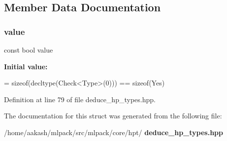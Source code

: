 \subsection{Member Data Documentation}
\mbox{\label{structmlpack_1_1hpt_1_1DeduceHyperParameterTypes_3_01T_00_01Args_8_8_8_01_4_1_1IsCollectionType_a11ddd051208250c32dc4985abcafa86d}} 
\subsubsection{value}
{\footnotesize\ttfamily const bool value\hspace{0.3cm}{\ttfamily [static]}}

{\bfseries Initial value\+:}
\begin{DoxyCode}
=
      \textcolor{keyword}{sizeof}(decltype(Check<Type>(0))) == \textcolor{keyword}{sizeof}(Yes)
\end{DoxyCode}


Definition at line 79 of file deduce\+\_\+hp\+\_\+types.\+hpp.



The documentation for this struct was generated from the following file\+:\begin{DoxyCompactItemize}
\item 
/home/aakash/mlpack/src/mlpack/core/hpt/\textbf{ deduce\+\_\+hp\+\_\+types.\+hpp}\end{DoxyCompactItemize}
